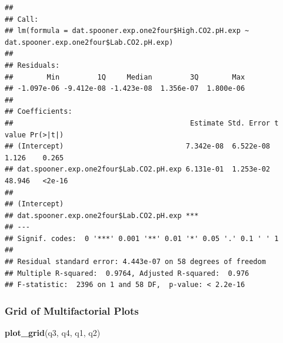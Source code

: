 \documentclass[]{article}
\newenvironment{Shaded}{\begin{snugshade}}{\end{snugshade}}
\newcommand{\KeywordTok}[1]{\textcolor[rgb]{0.13,0.29,0.53}{\textbf{#1}}}
\newcommand{\NormalTok}[1]{#1}
\newcommand{\OperatorTok}[1]{\textcolor[rgb]{0.81,0.36,0.00}{\textbf{#1}}}
\newcommand{\StringTok}[1]{\textcolor[rgb]{0.31,0.60,0.02}{#1}}
\begin{document}
\begin{Shaded}
\end{Shaded}

\begin{verbatim}
## 
## Call:
## lm(formula = dat.spooner.exp.one2four$High.CO2.pH.exp ~ dat.spooner.exp.one2four$Lab.CO2.pH.exp)
## 
## Residuals:
##        Min         1Q     Median         3Q        Max 
## -1.097e-06 -9.412e-08 -1.423e-08  1.356e-07  1.800e-06 
## 
## Coefficients:
##                                          Estimate Std. Error t value Pr(>|t|)
## (Intercept)                             7.342e-08  6.522e-08   1.126    0.265
## dat.spooner.exp.one2four$Lab.CO2.pH.exp 6.131e-01  1.253e-02  48.946   <2e-16
##                                            
## (Intercept)                                
## dat.spooner.exp.one2four$Lab.CO2.pH.exp ***
## ---
## Signif. codes:  0 '***' 0.001 '**' 0.01 '*' 0.05 '.' 0.1 ' ' 1
## 
## Residual standard error: 4.443e-07 on 58 degrees of freedom
## Multiple R-squared:  0.9764, Adjusted R-squared:  0.976 
## F-statistic:  2396 on 1 and 58 DF,  p-value: < 2.2e-16
\end{verbatim}

\hypertarget{grid-of-multifactorial-plots}{%
\subsubsection{Grid of Multifactorial
Plots}\label{grid-of-multifactorial-plots}}

\begin{Shaded}
\begin{Highlighting}[]
\KeywordTok{plot_grid}\NormalTok{(q3, q4, q1, q2) }
\end{Highlighting}
\end{Shaded}
\end{document}
